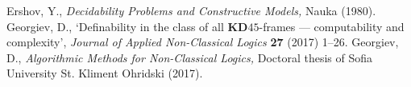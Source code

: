\documentclass[draft]{article}
\def\K{\mathbf{K}}
\def\KD{\mathbf{KD}}
\begin{document}
\begin{thebibliography}{}
%
%
%
%
{\sc Ershov,} Y.,
\emph{Decidability Problems and Constructive Models,}\/
Nauka (1980).
%
%
%
%
%
%
%
%
%
%
%
%
%
%
%
%
%
%
%
%
{\sc Georgiev,} D., 
`Definability in the class of all $\KD45$-frames --- computability and complexity',
\emph{Journal of Applied Non-Classical Logics}\/ {\bf 27} (2017) 1--26.
%
%
{\sc Georgiev,} D., 
\emph{Algorithmic Methods for Non-Classical Logics,}\/
Doctoral thesis of Sofia University St. Kliment Ohridski (2017).

\end{thebibliography}
\end{document}
